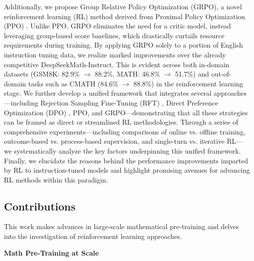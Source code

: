 Additionally, we propose Group Relative Policy Optimization (GRPO), a novel reinforcement learning (RL) method derived from Proximal Policy Optimization (PPO) \citep{schulman2017proximal}. Unlike PPO, GRPO eliminates the need for a critic model, instead leveraging group-based score baselines, which drastically curtails resource requirements during training. By applying GRPO solely to a portion of English instruction tuning data, we realize marked improvements over the already competitive DeepSeekMath-Instruct. This is evident across both in-domain datasets (GSM8K: 82.9\% $\rightarrow$ 88.2\%, MATH: 46.8\% $\rightarrow$ 51.7\%) and out-of-domain tasks such as CMATH (84.6\% $\rightarrow$ 88.8\%) in the reinforcement learning stage. We further develop a unified framework that integrates several approaches—including Rejection Sampling Fine-Tuning (RFT) \citep{yuan2023scaling}, Direct Preference Optimization (DPO) \citep{dpo}, PPO, and GRPO—demonstrating that all these strategies can be framed as direct or streamlined RL methodologies. Through a series of comprehensive experiments—including comparisons of online vs. offline training, outcome-based vs. process-based supervision, and single-turn vs. iterative RL—we systematically analyze the key factors underpinning this unified framework. Finally, we elucidate the reasons behind the performance improvements imparted by RL to instruction-tuned models and highlight promising avenues for advancing RL methods within this paradigm.

\subsection{Contributions}
This work makes advances in large-scale mathematical pre-training and delves into the investigation of reinforcement learning approaches.

\textbf{Math Pre-Training at Scale}

